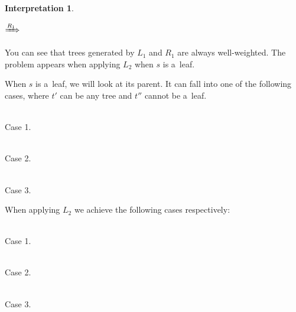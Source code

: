 \documentclass[final]{article}
\theoremstyle{definition}
\theoremstyle{definition}
\newtheorem{interpretation}{Interpretation}[subsection]
\theoremstyle{remark}
\newcommand{\includeinlinescaledsvg}[3]{\begin{minipage}{#1\textwidth}\begin{center}\end{center}\end{minipage}}
\begin{document}
\begin{interpretation}
\begin{center}
    \includeinlinescaledsvg{.16}{.5}{schroder__lr_base}%
    \(\xRightarrow{R_1}\)%
    \includeinlinescaledsvg{.16}{.5}{schroder__r1}%
\end{center}

You can see that trees generated by \(L_1\) and \(R_1\) are always well-weighted. The problem appears when applying \(L_2\) when \(s\) is a~leaf.

When \(s\) is a~leaf, we will look at its parent. It can fall into one of the following cases, where \(t'\) can be any tree and \(t''\) cannot be a~leaf.

\begin{center}
    \begin{minipage}[t]{.3\textwidth}
        \begin{center}
            \\
            Case 1.
        \end{center}
    \end{minipage}%
    \begin{minipage}[t]{.3\textwidth}
        \begin{center}
            \\
            Case 2.
        \end{center}
    \end{minipage}%
    \begin{minipage}[t]{.3\textwidth}
        \begin{center}
            \\
            Case 3.
        \end{center}
    \end{minipage}%
\end{center}

When applying \(L_2\) we achieve the following cases respectively:

\begin{center}
    \begin{minipage}[t]{.3\textwidth}
        \begin{center}
            \\
            Case 1.
        \end{center}
    \end{minipage}%
    \begin{minipage}[t]{.3\textwidth}
        \begin{center}
            \\
            Case 2.
        \end{center}
    \end{minipage}%
    \begin{minipage}[t]{.3\textwidth}
        \begin{center}
            \\
            Case 3.
        \end{center}
    \end{minipage}%
\end{center}


\end{interpretation}
\end{document}
